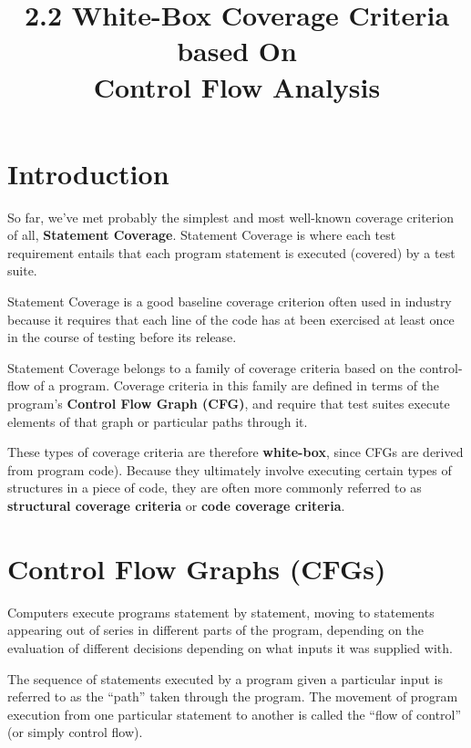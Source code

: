 



\title{2.2 White-Box Coverage Criteria based On\\ Control Flow Analysis}


\section{Introduction}
%
So far, we've met probably the simplest and most well-known coverage criterion
of all, {\bf Statement Coverage}. Statement Coverage is where each test
requirement entails that each program statement is executed (covered) by a test
suite. 

Statement Coverage is a good baseline coverage criterion often used in industry
because it requires that each line of the code has at been exercised at least
once in the course of testing before its release.

Statement Coverage belongs to a family of coverage criteria based on the
control-flow of a program. Coverage criteria in this family are defined in terms
of the program's {\bf Control Flow Graph (CFG)}, and require that test suites
execute elements of that graph or particular paths through it. 

These types of coverage criteria are therefore {\bf white-box}, since CFGs are
derived from program code). Because they ultimately involve executing certain
types of structures in a piece of code, they are often more commonly referred to
as {\bf structural coverage criteria} or {\bf code coverage criteria}.


\section{Control Flow Graphs (CFGs)}


Computers execute programs statement by statement, moving to statements
appearing out of series in different parts of the program, depending on the
evaluation of different decisions depending on what inputs it was supplied with.

The sequence of statements executed by a program given a particular input is
referred to as the ``path'' taken through the program. The movement of program
execution from one particular statement to another is called the ``flow of
control'' (or simply control flow).

